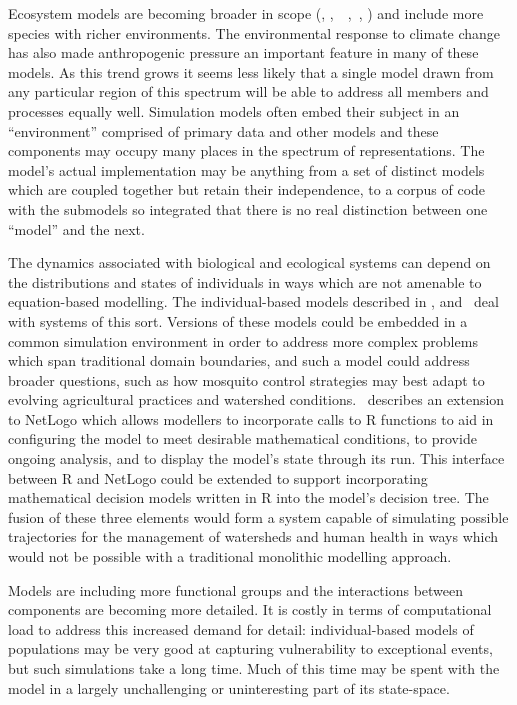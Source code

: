 Ecosystem models are becoming broader in scope (\citet{rose10:1},
\citet{DeAngelis98:1},~\citet{Harvey03:1}~\citet{Fulton04:1},~\citet{gray2006nws},
\citet{Ningaloo:1}) and include more species with richer environments. The
environmental response to climate change has also made anthropogenic pressure
an important feature in many of these models. As this trend grows it seems
less likely that a single model drawn from any particular region of this
spectrum will be able to address all members and processes equally well.
Simulation models often embed their subject in an ``environment'' comprised of
primary data and other models and these components may occupy many places in
the spectrum of representations. The model's actual implementation may be
anything from a set of distinct models which are coupled together but retain
their independence, to a corpus of code with the submodels so integrated that
there is no real distinction between one ``model'' and the next.

The dynamics associated with biological and ecological systems can depend on
the distributions and states of individuals in ways which are not amenable to
equation-based modelling. The individual-based models described in
\citet{Farolfi2010}, and~\citet{Almeida2010} deal with systems of this sort.
Versions of these models could be embedded in a common simulation environment
in order to address more complex problems which span traditional domain
boundaries, and such a model could address broader questions, such as how
mosquito control strategies may best adapt to evolving agricultural practices
and watershed conditions.~\citet{Thiele2010} describes an extension to NetLogo
which allows modellers to incorporate calls to R functions to aid in
configuring the model to meet desirable mathematical conditions, to provide
ongoing analysis, and to display the model's state through its run. This
interface between R and NetLogo could be extended to support incorporating
mathematical decision models written in R into the model's decision tree. The
fusion of these three elements would form a system capable of simulating
possible trajectories for the management of watersheds and human health in
ways which would not be possible with a traditional monolithic modelling
approach.

Models are including more functional groups and the interactions between
components are becoming more detailed. It is costly in terms of computational
load to address this increased demand for detail: individual-based models of
populations may be very good at capturing vulnerability to exceptional events,
but such simulations take a long time. Much of this time may be spent with the
model in a largely unchallenging or uninteresting part of its state-space.

